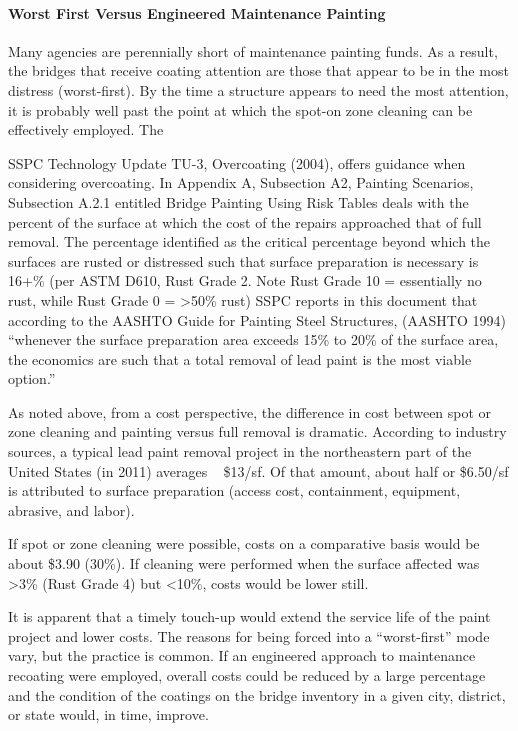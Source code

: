 \paragraph{Worst First Versus Engineered Maintenance Painting}

Many agencies are perennially short of maintenance painting funds. As a result, the bridges that receive coating
attention are those that appear to be in the most distress (worst-first). By the time a structure appears to need the
most attention, it is probably well past the point at which the spot-on zone cleaning can be effectively employed. The

SSPC Technology Update TU-3, Overcoating (2004), offers guidance when considering overcoating. In Appendix
A, Subsection A2, Painting Scenarios, Subsection A.2.1 entitled Bridge Painting Using Risk Tables deals with the
percent of the surface at which the cost of the repairs approached that of full removal. The percentage identified as
the critical percentage beyond which the surfaces are rusted or distressed such that surface preparation is necessary is
16+\% (per ASTM D610, Rust Grade 2. Note Rust Grade 10 = essentially no rust, while Rust Grade 0 = >50\% rust)
SSPC reports in this document that according to the AASHTO Guide for Painting Steel Structures, (AASHTO
1994) “whenever the surface preparation area exceeds 15\% to 20\% of the surface area, the economics are such that a
total removal of lead paint is the most viable option.”

As noted above, from a cost perspective, the difference in cost between spot or zone cleaning and painting versus
full removal is dramatic. According to industry sources, a typical lead paint removal project in the northeastern part
of the United States (in 2011) averages ~ \$13/sf. Of that amount, about half or \$6.50/sf is attributed to surface
preparation (access cost, containment, equipment, abrasive, and labor).

If spot or zone cleaning were possible, costs on a comparative basis would be about \$3.90 (30\%). If cleaning
were performed when the surface affected was >3\% (Rust Grade 4) but <10\%, costs would be lower still.

It is apparent that a timely touch-up would extend the service life of the paint project and lower costs. The
reasons for being forced into a “worst-first” mode vary, but the practice is common. If an engineered approach to
maintenance recoating were employed, overall costs could be reduced by a large percentage and the condition of the
coatings on the bridge inventory in a given city, district, or state would, in time, improve.

